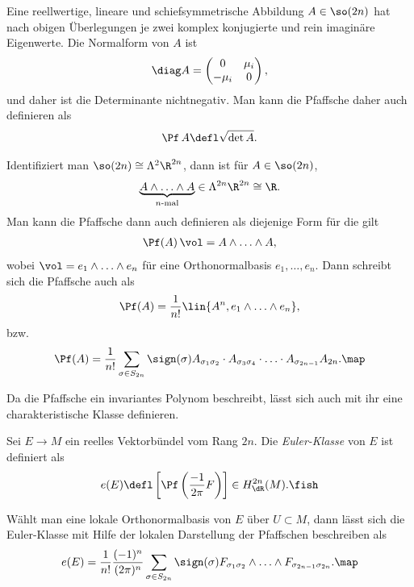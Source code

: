 \documentclass[%
	paper=a5,%
	fleqn,%
	DIV=18,%
	BCOR=0mm,
	fontsize=11pt,
	titlepage=false,%
	bibliography=totoc,
	DIV=18,%
	twoside=true,
	pdftitle=Riemannsche Geometrie,
	pdfauthor=Uwe Semmelmann,
	numbers=noendperiod]%
	{scrbook}
\begin{document}
Eine reellwertige, lineare und schiefsymmetrische Abbildung $A\in\so(2n)$ hat nach obigen Überlegungen je zwei komplex konjugierte und rein imaginäre Eigenwerte. Die Normalform von $A$ ist
\begin{align*}
\diag
A=\begin{pmatrix}
0 & \mu_{i}\\
-\mu_{i} & 0
\end{pmatrix},
\end{align*}
und daher ist die Determinante nichtnegativ. Man kann die Pfaffsche daher auch definieren als
\begin{align*}
\Pf \, A \defl \sqrt{\det A}.
\end{align*}

Identifiziert man $\so(2n)\cong \Lambda^2\R^{2n}$, dann ist für $A\in\so(2n)$,
\begin{align*}
\underbrace{A\wedge \ldots \wedge A}_{n\text{-mal}} \in \Lambda^{2n}\R^{2n} \cong \R.
\end{align*}
Man kann die Pfaffsche dann auch definieren als diejenige Form für die gilt
\begin{align*}
\Pf(A)\,\vol = A\wedge \ldots \wedge A,
\end{align*}
wobei $\vol = e_{1}\wedge \ldots\wedge e_{n}$ für eine Orthonormalbasis $e_{1},\ldots,e_{n}$. Dann schreibt sich die Pfaffsche auch als
\begin{align*}
\Pf(A) = \frac{1}{n!} \lin{A^n,e_{1}\wedge \ldots \wedge e_{n}},
\end{align*}
bzw.
\begin{align*}
\Pf(A) = \frac{1}{n!}\sum_{\sigma\in S_{2n}} \sign(\sigma) A_{\sigma_{1}\sigma_{2}}\cdot A_{\sigma_{3}\sigma_{4}}\cdot \ldots \cdot A_{\sigma_{2n-1}}A_{2n}.\map
\end{align*}

Da die Pfaffsche ein invariantes Polynom beschreibt, lässt sich auch mit ihr eine charakteristische Klasse definieren.

\begin{defn}
Sei $E\to M$ ein reelles Vektorbündel vom Rang $2n$. Die \emph{Euler-Klasse} von $E$ ist definiert als
\begin{align*}
e(E) \defl \left[\Pf\left(\frac{-1}{2\pi}F\right)\right] \in H_{\dR}^{2n}(M).\fish 
\end{align*}
\end{defn}

\begin{rem}
Wählt man eine lokale Orthonormalbasis von $E$ über $U\subset M$, dann lässt sich die Euler-Klasse mit Hilfe der lokalen Darstellung der Pfaffschen beschreiben als
\begin{align*}
e(E) = \frac{1}{n!}\frac{(-1)^n}{(2\pi)^n}\sum_{\sigma\in S_{2n}} \sign(\sigma) F_{\sigma_{1}\sigma_{2}}\wedge \ldots
\wedge F_{\sigma_{2n-1}\sigma_{2n}}.\map
\end{align*}
\end{rem}
\end{document}
